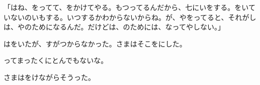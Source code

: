 「はね、をってて、をかけてやる。もつってるんだから、七にいをする。をいていないのいもする。いつするかわからないからね。が、やをってると、それがしは、やのためになるんだ。だけどは、のためには、なってやしない。」

はをいたが、すがつからなかった。さまはそこをにした。

ってまったくにとんでもないな。

さまはをけながらそうった。


